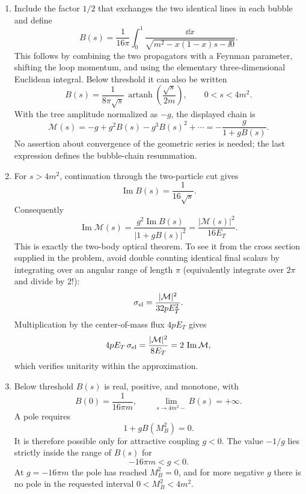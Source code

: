 \begin{enumerate}
\begin{enumerate}
\item
Include the factor \(1/2\) that exchanges the two identical lines in
each bubble and define
\[
 B(s)=\frac{1}{16\pi}\int_0^1
 \frac{\dd x}{\sqrt{m^2-x(1-x)s-\ii0}}.
\]
This follows by combining the two propagators with a Feynman parameter,
shifting the loop momentum, and using the elementary three-dimensional
Euclidean integral.  Below threshold it can also be written
\[
 B(s)=\frac{1}{8\pi\sqrt{s}}\,
 \operatorname{artanh}\!\left(\frac{\sqrt{s}}{2m}\right),
\qquad 0<s<4m^2.
\]
With the tree amplitude normalized as \(-g\), the displayed chain is
\[
 \mathcal M(s)
 =-g+g^2B(s)-g^3B(s)^2+\cdots
 =\boxed{-\frac{g}{1+gB(s)}}.
\]
No assertion about convergence of the geometric series is needed; the
last expression defines the bubble-chain resummation.
\item
For \(s>4m^2\), continuation through the two-particle cut gives
\[
 \operatorname{Im}B(s)=\frac{1}{16\sqrt{s}}.
\]
Consequently
\[
 \operatorname{Im}\mathcal M(s)
 =\frac{g^2\operatorname{Im}B(s)}
 {|1+gB(s)|^2}
 =\frac{|\mathcal M(s)|^2}{16E_T}.
\]
This is exactly the two-body optical theorem.  To see it from the
cross section supplied in the problem, avoid double counting identical
final scalars by integrating over an angular range of length \(\pi\)
(equivalently integrate over \(2\pi\) and divide by \(2!\)):
\[
 \sigma_{\rm el}
 =\frac{|\mathcal M|^2}{32pE_T^2}.
\]
Multiplication by the center-of-mass flux \(4pE_T\) gives
\[
 4pE_T\,\sigma_{\rm el}
 =\frac{|\mathcal M|^2}{8E_T}
 =2\,\operatorname{Im}\mathcal M,
\]
which verifies unitarity within the approximation.
\item
Below threshold \(B(s)\) is real, positive, and monotone, with
\[
 B(0)=\frac{1}{16\pi m},\qquad
 \lim_{s\to4m^2-}B(s)=+\infty.
\]
A pole requires
\[
 1+gB(M_B^2)=0.
\]
It is therefore possible only for attractive coupling \(g<0\).
The value \(-1/g\) lies strictly inside the range of \(B(s)\) for
\[
 \boxed{-16\pi m<g<0.}
\]
At \(g=-16\pi m\) the pole has reached \(M_B^2=0\), and for more
negative \(g\) there is no pole in the requested interval
\(0<M_B^2<4m^2\).
\end{enumerate}


\end{enumerate}
